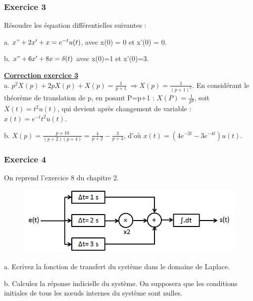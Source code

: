 \documentclass[11pt]{report}
\begin{document}
	\subsubsection{Exercice 3}
	
	Résoudre les équation différentielles suivantes :
	
	a. $x"+2x'+x=e^{-t}u(t)$, avec x(0) = 0 et x'(0) = 0. 
	
	b. $x"+6x'+8x=\delta(t)$ avec x(0)=1 et x'(0)=3. 
	
	\vspace{1\baselineskip}
	
	\textbf{\underline{Correction exercice 3}}\\
	
	a. $p^{2}X(p)+2pX(p)+X(p)=\frac{1}{p+1}~\Rightarrow X(p)=\frac{1}{(p+1)^{3}}$. En considérant le théorème de translation de p, en posant P=p+1 : $X(P)=\frac{1}{P^{3}}$, soit $X(t)=t^{2}u(t)$, qui devient après changement de variable : $x(t)=e^{-t}t^{2}u(t)$.
	
	b. $X(p)=\frac{p+10}{(p+2)(p+4)} = \frac{4}{p+2}-\frac{3}{p+4}$, d'où $x(t) = (4e^{-2t}-3e^{-4t})u(t)$.
	
	\vspace{1\baselineskip}
	
	
	\subsubsection{Exercice 4}
	
	On reprend l'exercice 8 du chapitre 2.
	
	
	\begin{figure}[h!]
		\centering
		\includegraphics[scale=0.5]{images/Exo_2_6.jpg} 
	\end{figure}
	
	a. Ecrivez la fonction de transfert du système dans le domaine de Laplace.
	
	b. Calculez la réponse indicielle du système. On supposera que les conditions initiales de tous les nœuds internes du système sont nulles. 
	
	\vspace{1\baselineskip}
	
\end{document}
